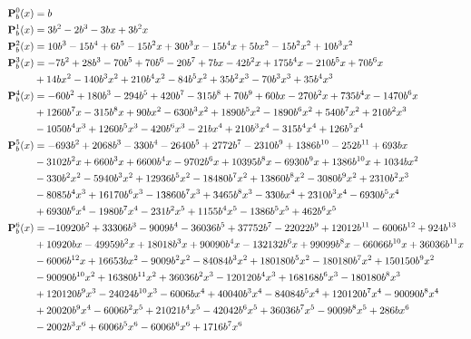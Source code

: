 \begin{equation*}
    \begin{split}
        {\mathbf{P}}\sp{0} \sb{b}(x)
        &=b \\
        {\mathbf{P}}\sp{1} \sb{b}(x)
        &=3 b^2 - 2 b^3 - 3 b x + 3 b^2 x \\
        {\mathbf{P}}\sp{2} \sb{b}(x)
        &=10 b^3 - 15 b^4 + 6 b^5- 15 b^2 x + 30 b^3 x - 15 b^4 x + 5 b x^2 - 15 b^2 x^2 + 10 b^3 x^2 \\
        {\mathbf{P}}\sp{3} \sb{b}(x)
        &=-7 b^2 + 28 b^3 - 70 b^5 + 70 b^6 - 20 b^7 + 7 b x - 42 b^2 x + 175 b^4 x - 210 b^5 x + 70 b^6 x \\
        &+ 14 b x^2 - 140 b^3 x^2 + 210 b^4 x^2 - 84 b^5 x^2 + 35 b^2 x^3 - 70 b^3 x^3 + 35 b^4 x^3 \\
        {\mathbf{P}}\sp{4} \sb{b}(x)
        &= -60 b^2 + 180 b^3 - 294 b^5 + 420 b^7 - 315 b^8 + 70 b^9 + 60 b x - 270 b^2 x + 735 b^4 x - 1470 b^6 x \\
        &+ 1260 b^7 x - 315 b^8 x + 90 b x^2 - 630 b^3 x^2 + 1890 b^5 x^2 - 1890 b^6 x^2 + 540 b^7 x^2 + 210 b^2 x^3 \\
        &- 1050 b^4 x^3 + 1260 b^5 x^3 - 420 b^6 x^3 - 21 b x^4 + 210 b^3 x^4 - 315 b^4 x^4 + 126 b^5 x^4\\
        {\mathbf{P}}\sp{5} \sb{b}(x)
        &= -693 b^2 + 2068 b^3 - 330 b^4 - 2640 b^5 + 2772 b^7 - 2310 b^9 + 1386 b^{10} - 252 b^{11} + 693 b x \\
        &- 3102 b^2 x + 660 b^3 x + 6600 b^4 x - 9702 b^6 x + 10395 b^8 x - 6930 b^9 x + 1386 b^{10} x + 1034 b x^2 \\
        &- 330 b^2 x^2 - 5940 b^3 x^2 + 12936 b^5 x^2 - 18480 b^7 x^2 + 13860 b^8 x^2 - 3080 b^9 x^2 + 2310 b^2 x^3 \\
        &- 8085 b^4 x^3 + 16170 b^6 x^3 - 13860 b^7 x^3 + 3465 b^8 x^3 - 330 b x^4 + 2310 b^3 x^4 - 6930 b^5 x^4 \\
        &+ 6930 b^6 x^4 - 1980 b^7 x^4 - 231 b^2 x^5 + 1155 b^4 x^5 - 1386 b^5 x^5 + 462 b^6 x^5 \\
        {\mathbf{P}}\sp{6} \sb{b}(x)
        &= -10920 b^2 + 33306 b^3 - 9009 b^4 - 36036 b^5 + 37752 b^7 - 22022 b^9 + 12012 b^{11} - 6006 b^{12} + 924 b^{13} \\
        &+ 10920 b x - 49959 b^2 x + 18018 b^3 x + 90090 b^4 x - 132132 b^6 x + 99099 b^8 x - 66066 b^{10} x + 36036 b^{11} x \\
        &- 6006 b^{12} x + 16653 b x^2 - 9009 b^2 x^2 - 84084 b^3 x^2 + 180180 b^5 x^2 - 180180 b^7 x^2 + 150150 b^9 x^2 \\
        &- 90090 b^{10} x^2 + 16380 b^{11} x^2 + 36036 b^2 x^3 - 120120 b^4 x^3 + 168168 b^6 x^3 - 180180 b^8 x^3 \\
        &+ 120120 b^9 x^3 - 24024 b^{10} x^3 - 6006 b x^4 + 40040 b^3 x^4 - 84084 b^5 x^4 + 120120 b^7 x^4 - 90090 b^8 x^4 \\
        &+ 20020 b^9 x^4 - 6006 b^2 x^5 + 21021 b^4 x^5 - 42042 b^6 x^5 + 36036 b^7 x^5 - 9009 b^8 x^5 + 286 b x^6 \\
        &- 2002 b^3 x^6 + 6006 b^5 x^6 - 6006 b^6 x^6 + 1716 b^7 x^6
    \end{split}
\end{equation*}
